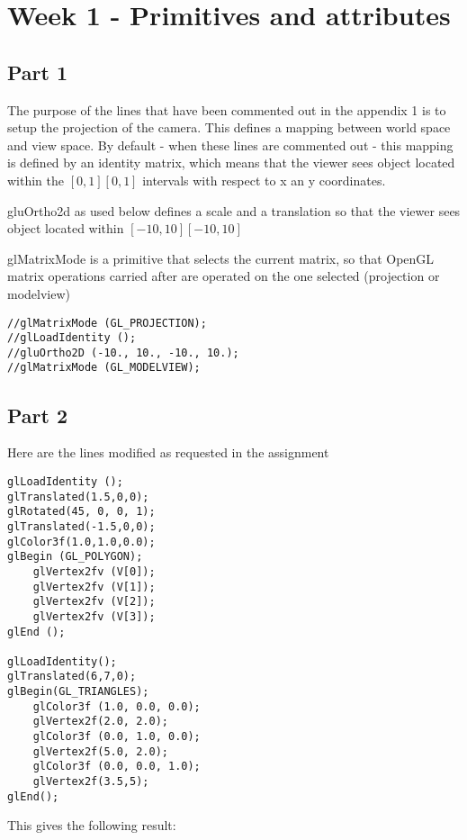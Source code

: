 \chapter{Week 1 - Primitives and attributes}

\section{Part 1}
The purpose of the lines that have been commented out in the appendix 1 is to
setup the projection of the camera. This defines a mapping between world space
and view space. By default - when these lines are commented out - this mapping
is defined by an identity matrix, which means that the viewer sees object located
within the $[0,1][0,1]$ intervals with respect to x an y coordinates.

gluOrtho2d as used below defines a scale and a translation so that the viewer sees object
located within $[-10,10][-10,10]$    


glMatrixMode is a primitive that selects the current matrix, so that OpenGL matrix
operations carried after are operated on the one selected (projection or modelview)

\begin{verbatim}
//glMatrixMode (GL_PROJECTION);
//glLoadIdentity ();
//gluOrtho2D (-10., 10., -10., 10.);
//glMatrixMode (GL_MODELVIEW);
\end{verbatim}

\section{Part 2}

Here are the lines modified as requested in the assignment
\begin{lstlisting}[caption=Snapshot from Part2.cpp]
glLoadIdentity ();
glTranslated(1.5,0,0);
glRotated(45, 0, 0, 1);
glTranslated(-1.5,0,0);
glColor3f(1.0,1.0,0.0);
glBegin (GL_POLYGON);
    glVertex2fv (V[0]);
    glVertex2fv (V[1]);
    glVertex2fv (V[2]);
    glVertex2fv (V[3]);
glEnd ();

glLoadIdentity();
glTranslated(6,7,0);
glBegin(GL_TRIANGLES);
    glColor3f (1.0, 0.0, 0.0);
    glVertex2f(2.0, 2.0);
    glColor3f (0.0, 1.0, 0.0);
    glVertex2f(5.0, 2.0);
    glColor3f (0.0, 0.0, 1.0);
    glVertex2f(3.5,5);
glEnd();
\end{lstlisting}

This gives the following result:



